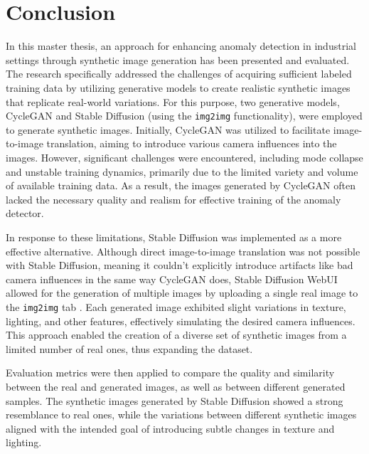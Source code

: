 \documentclass[12pt,DIV14,BCOR12mm,a4paper,footinclude=false,headinclude,parskip=half-,twoside,openright,cleardoublepage=empty,toc=index,bibliography=totoc,listof=totoc]{scrreprt}
\numberwithin{equation}{chapter}
\begin{document}
\chapter{Conclusion}
\label{chapter5}

In this master thesis, an approach for enhancing anomaly detection in industrial settings through synthetic image generation has been presented and evaluated. The research specifically addressed the challenges of acquiring sufficient labeled training data by utilizing generative models to create realistic synthetic images that replicate real-world variations. For this purpose, two generative models, CycleGAN and Stable Diffusion (using the \texttt{img2img} functionality), were employed to generate synthetic images. Initially, CycleGAN was utilized to facilitate image-to-image translation, aiming to introduce various camera influences into the images. However, significant challenges were encountered, including mode collapse and unstable training dynamics, primarily due to the limited variety and volume of available training data. As a result, the images generated by CycleGAN often lacked the necessary quality and realism for effective training of the anomaly detector.

In response to these limitations, Stable Diffusion was implemented as a more effective alternative. Although direct image-to-image translation was not possible with Stable Diffusion, meaning it couldn't explicitly introduce artifacts like bad camera influences in the same way CycleGAN does, Stable Diffusion WebUI allowed for the generation of multiple images by uploading a single real image to the \texttt{img2img} tab . Each generated image exhibited slight variations in texture, lighting, and other features, effectively simulating the desired camera influences. This approach enabled the creation of a diverse set of synthetic images from a limited number of real ones, thus expanding the dataset.

Evaluation metrics were then applied to compare the quality and similarity between the real and generated images, as well as between different generated samples. The synthetic images generated by Stable Diffusion showed a strong resemblance to real ones, while the variations between different synthetic images aligned with the intended goal of introducing subtle changes in texture and lighting.
\end{document}
